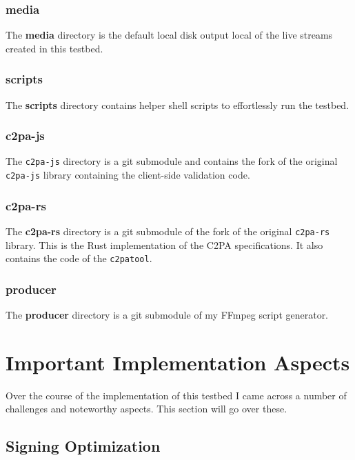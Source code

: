 \subsubsection{media}

The \textbf{media} directory is the default local disk output local of the live streams created in this testbed.

\subsubsection{scripts}

The \textbf{scripts} directory contains helper shell scripts to effortlessly run the testbed.

\subsubsection{c2pa-js}

The \texttt{c2pa-js} directory is a git submodule and contains the fork of the original \texttt{c2pa-js} library containing the client-side validation code.

\subsubsection{c2pa-rs} 

The \textbf{c2pa-rs} directory is a git submodule of the fork of the original \texttt{c2pa-rs} library. This is the Rust implementation of the C2PA specifications. It also contains the code of the \texttt{c2patool}.

\subsubsection{producer}

The \textbf{producer} directory is a git submodule of my FFmpeg script generator.

\section{Important Implementation Aspects\label{sec:implaspects}}

Over the course of the implementation of this testbed I came across a number of challenges and noteworthy aspects. This section will go over these.

\subsection{Signing Optimization\label{sec:optimization}}

